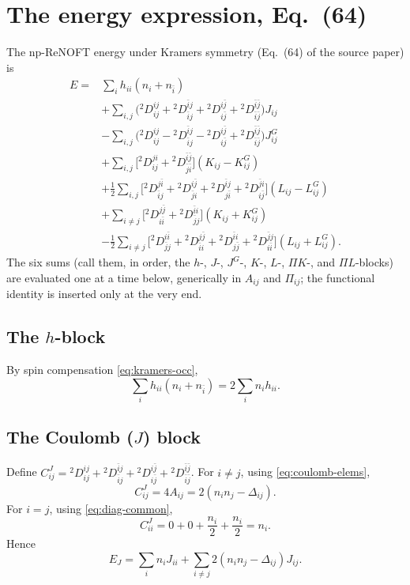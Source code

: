 \documentclass[11pt,a4paper]{article}
\newcommand{\Dtwo}{{}^2D}
\newcommand{\PiMat}{\Pi}
\newcommand{\DeltaMat}{\Delta}
\begin{document}
\section{The energy expression, Eq.~(64)}
\label{sec:E64}

The np-ReNOFT energy under Kramers symmetry (Eq.~(64) of the source
paper) is
\begin{align}
E={}&\sum_i h_{ii}(n_i+n_{\bar i})
\nonumber\\
&+\sum_{i,j}\Big(\Dtwo^{ij}_{ij}+\Dtwo^{\bar ij}_{\bar ij}
+\Dtwo^{i\bar j}_{i\bar j}+\Dtwo^{\bar i\bar j}_{\bar i\bar j}\Big)J_{ij}
\nonumber\\
&-\sum_{i,j}\Big(\Dtwo^{ij}_{ij}-\Dtwo^{\bar ij}_{\bar ij}
-\Dtwo^{i\bar j}_{i\bar j}+\Dtwo^{\bar i\bar j}_{\bar i\bar j}\Big)J^G_{ij}
\nonumber\\
&+\sum_{i,j}\Big[\Dtwo^{ji}_{ij}+\Dtwo^{\bar i\bar j}_{\bar j\bar i}\Big](K_{ij}-K^G_{ij})
\nonumber\\
&+\frac12\sum_{i,j}\Big[\Dtwo^{j\bar i}_{\bar ij}+\Dtwo^{i\bar j}_{\bar ji}
+\Dtwo^{\bar ij}_{j\bar i}+\Dtwo^{\bar ji}_{i\bar j}\Big](L_{ij}-L^G_{ij})
\nonumber\\
&+\sum_{i\neq j}\Big[\Dtwo^{j\bar j}_{i\bar i}+\Dtwo^{\bar ii}_{\bar jj}\Big](K_{ij}+K^G_{ij})
\nonumber\\
&-\frac12\sum_{i\neq j}\Big[\Dtwo^{i\bar i}_{\bar jj}+\Dtwo^{j\bar j}_{\bar ii}
+\Dtwo^{\bar ii}_{j\bar j}+\Dtwo^{\bar jj}_{i\bar i}\Big](L_{ij}+L^G_{ij}).
\label{eq:E64}
\end{align}
The six sums (call them, in order, the $h$-, $J$-, $J^G$-, $K$-,
$L$-, $\PiMat K$-, and $\PiMat L$-blocks) are evaluated one at a time
below, generically in $A_{ij}$ and $\PiMat_{ij}$; the functional
identity is inserted only at the very end.

\subsection{The $h$-block}
By spin compensation \eqref{eq:kramers-occ},
\begin{equation}
\sum_i h_{ii}(n_i+n_{\bar i})=2\sum_i n_ih_{ii}.
\label{eq:hblock}
\end{equation}

\subsection{The Coulomb ($J$) block}
Define $C^J_{ij}=\Dtwo^{ij}_{ij}+\Dtwo^{\bar ij}_{\bar ij}+\Dtwo^{i\bar j}_{i\bar j}+\Dtwo^{\bar i\bar j}_{\bar i\bar j}$.
For $i\neq j$, using \eqref{eq:coulomb-elems},
\begin{equation}
C^J_{ij}=4A_{ij}=2(n_in_j-\DeltaMat_{ij}).
\label{eq:CJ-offdiag}
\end{equation}
For $i=j$, using \eqref{eq:diag-common},
\begin{equation}
C^J_{ii}=0+0+\frac{n_i}{2}+\frac{n_i}{2}=n_i.
\label{eq:CJ-diag}
\end{equation}
Hence
\begin{equation}
E_J=\sum_i n_iJ_{ii}+\sum_{i\neq j}2(n_in_j-\DeltaMat_{ij})J_{ij}.
\label{eq:EJ}
\end{equation}
\end{document}
